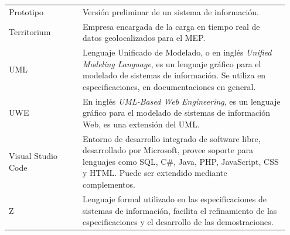 \documentclass[a4paper, 9pt, conference]{article}              %
\theoremstyle{definition}
\begin{document}
\begin{table}[H]
\begin{tabular}{p{0.25\linewidth}p{0.7\linewidth}}
		\hdashline%
		Prototipo & Versi\'on preliminar de un sistema de informaci\'on. \\
		\hdashline%
		Territorium & Empresa encargada de la carga en tiempo real de datos geolocalizados para el MEP. \\
		\hdashline%
		UML & Lenguaje Unificado de Modelado, o en ingl\'es \emph{Unified Modeling Language}, es un lenguaje gr\'afico para el modelado de sistemas de informaci\'on. Se utiliza en especificaciones, en documentaciones en general. \\
		\hdashline%
		UWE & En ingl\'es \emph{UML-Based Web Engineering}, es un lenguaje gr\'afico para el modelado de sistemas de informaci\'on Web, es una extensi\'on del UML. \\
		\hdashline%
		Visual Studio Code & Entorno de desarrollo integrado de software libre, desarrollado por Microsoft, provee soporte para lenguajes como SQL, C\#, Java, PHP, JavaScript, CSS y HTML. Puede ser extendido mediante complementos. \\
		\hdashline%
		Z & Lenguaje formal utilizado en las especificaciones de sistemas de informaci\'on, facilita el refinamiento de las especificaciones y el desarrollo de las demostraciones.
	\end{tabular}
\end{table}

\end{document}

